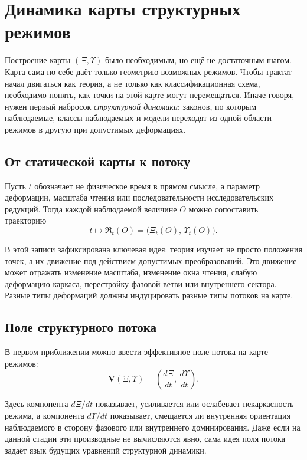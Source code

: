 \documentclass[12pt,a4paper]{article}
\begin{document}
\section{Динамика карты структурных режимов}

Построение карты \((\Xi,\Upsilon)\) было необходимым, но ещё не достаточным шагом. Карта сама по себе даёт только геометрию возможных режимов. Чтобы трактат начал двигаться как теория, а не только как классификационная схема, необходимо понять, как точки на этой карте могут перемещаться. Иначе говоря, нужен первый набросок \textit{структурной динамики}: законов, по которым наблюдаемые, классы наблюдаемых и модели переходят из одной области режимов в другую при допустимых деформациях.

\subsection{От статической карты к потоку}

Пусть \(t\) обозначает не физическое время в прямом смысле, а параметр деформации, масштаба чтения или последовательности исследовательских редукций. Тогда каждой наблюдаемой величине \(O\) можно сопоставить траекторию
\begin{equation}
 t \longmapsto \mathfrak{R}_t(O) = \big( \Xi_t(O), \, \Upsilon_t(O) \big).
\end{equation}

В этой записи зафиксирована ключевая идея: теория изучает не просто положения точек, а их движение под действием допустимых преобразований. Это движение может отражать изменение масштаба, изменение окна чтения, слабую деформацию каркаса, перестройку фазовой ветви или внутреннего сектора. Разные типы деформаций должны индуцировать разные типы потоков на карте.

\subsection{Поле структурного потока}

В первом приближении можно ввести эффективное поле потока на карте режимов:
\begin{equation}
\mathbf{V}(\Xi,\Upsilon) = \left( \frac{d\Xi}{dt}, \, \frac{d\Upsilon}{dt} \right).
\end{equation}

Здесь компонента \(d\Xi/dt\) показывает, усиливается или ослабевает некаркасность режима, а компонента \(d\Upsilon/dt\) показывает, смещается ли внутренняя ориентация наблюдаемого в сторону фазового или внутреннего доминирования. Даже если на данной стадии эти производные не вычисляются явно, сама идея поля потока задаёт язык будущих уравнений структурной динамики.
\end{document}
